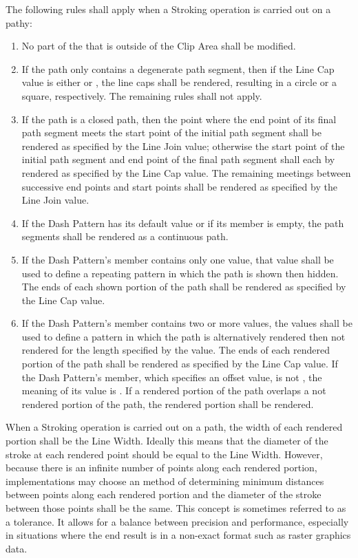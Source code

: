\pnum
The following rules shall apply when a Stroking operation is carried out on a pathy:
\begin{enumerate}
\item No part of the \underlyingsurface that is outside of the Clip Area shall be modified.

\item If the path only contains a degenerate path segment, then if the Line Cap value is either  or , the line caps shall be rendered, resulting in a circle or a square, respectively. The remaining rules shall not apply.

\item If the path is a closed path, then the point where the end point of its final path segment meets the start point of the initial path segment shall be rendered as specified by the Line Join value; otherwise the start point of the initial path segment and end point of the final path segment shall each by rendered as specified by the Line Cap value. The remaining meetings between successive end points and start points shall be rendered as specified by the Line Join value.

\item If the Dash Pattern has its default value or if its  member is empty, the path segments shall be rendered as a continuous path.

\item If the Dash Pattern's  member contains only one value, that value shall be used to define a repeating pattern in which the path is shown then hidden. The ends of each shown portion of the path shall be rendered as specified by the Line Cap value.

\item If the Dash Pattern's  member contains two or more values, the values shall be used to define a pattern in which the path is alternatively rendered then not rendered for the length specified by the value. The ends of each rendered portion of the path shall be rendered as specified by the Line Cap value. If the Dash Pattern's  member, which specifies an offset value, is not , the meaning of its value is . If a rendered portion of the path overlaps a not rendered portion of the path, the rendered portion shall be rendered.
\end{enumerate}

\pnum
When a Stroking operation is carried out on a path, the width of each rendered portion shall be the Line Width. Ideally this means that the diameter of the stroke at each rendered point should be equal to the Line Width. However, because there is an infinite number of points along each rendered portion, implementations may choose an \unspecnorm method of determining minimum distances between points along each rendered portion and the diameter of the stroke between those points shall be the same.
\enternote
This concept is sometimes referred to as a tolerance. It allows for a balance between precision and performance, especially in situations where the end result is in a non-exact format such as raster graphics data.
\exitnote


